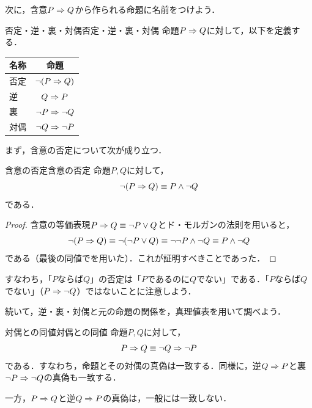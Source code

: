 次に，含意$P \mathrel{\Rightarrow} Q$から作られる命題に名前をつけよう．

\begin{definition}{否定・逆・裏・対偶}{否定・逆・裏・対偶}
  命題$P \mathrel{\Rightarrow} Q$に対して，以下を定義する．
  \begin{center}
    \begin{tabular}{|l|c|} \hline
      名称                      & 命題                  \\ \hline
      否定\index{ひてい@否定}   & $\lnot ( P \mathrel{\Rightarrow} Q )$     \\ \hline
      逆\index{ぎゃく@逆}       & $Q \mathrel{\Rightarrow} P$               \\ \hline
      裏\index{うら@裏}         & $\lnot P \mathrel{\Rightarrow} \lnot Q$   \\ \hline
      対偶\index{たいぐう@対偶} & $\lnot Q \mathrel{\Rightarrow} \lnot P$   \\ \hline
    \end{tabular}
  \end{center}
\end{definition}

まず，含意の否定について次が成り立つ．

\begin{prop}{含意の否定}{含意の否定}
  命題$P,Q$に対して，
  \[
    \lnot ( P \mathrel{\Rightarrow} Q ) \equiv P \land \lnot Q
  \]
  である．
\end{prop}

\begin{tleftbar}
  \begin{proof}
    含意の等価表現$P \mathrel{\Rightarrow} Q \equiv \lnot P \lor Q$とド・モルガンの法則を用いると，
    \[
      \lnot ( P \mathrel{\Rightarrow} Q )
      \equiv \lnot ( \lnot P \lor Q )
      \equiv \lnot \lnot P \land \lnot Q
      \equiv P \land \lnot Q
    \]
    である（最後の同値でを用いた）．これが証明すべきことであった．
  \end{proof}
\end{tleftbar}

すなわち，「$P$ならば$Q$」の否定は「$P$であるのに$Q$でない」である．「$P$ならば$Q$でない」（$P \mathrel{\Rightarrow} \lnot Q$）ではないことに注意しよう．

続いて，逆・裏・対偶と元の命題の関係を，真理値表を用いて調べよう．

\begin{prop}{対偶との同値}{対偶との同値}
  命題$P,Q$に対して，
  \[
    P \mathrel{\Rightarrow} Q \equiv \lnot Q \mathrel{\Rightarrow} \lnot P
  \]
  である．すなわち，命題とその対偶の真偽は一致する．同様に，逆$Q \mathrel{\Rightarrow} P$と裏$\lnot P \mathrel{\Rightarrow} \lnot Q$の真偽も一致する．

  一方，$P \mathrel{\Rightarrow} Q$と逆$Q \mathrel{\Rightarrow} P$の真偽は，一般には一致しない．
\end{prop}

